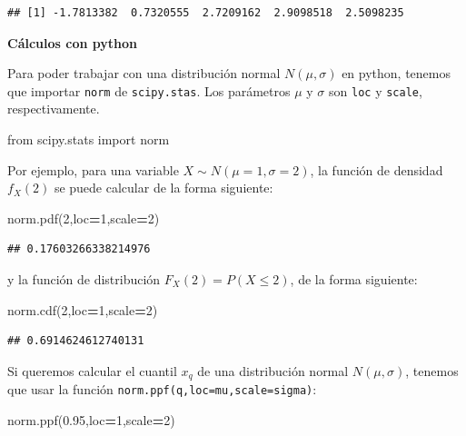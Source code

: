 \documentclass[]{book}
\newenvironment{Shaded}{\begin{snugshade}}{\end{snugshade}}
\newcommand{\DecValTok}[1]{\textcolor[rgb]{0.00,0.00,0.81}{#1}}
\newcommand{\FloatTok}[1]{\textcolor[rgb]{0.00,0.00,0.81}{#1}}
\newcommand{\ImportTok}[1]{#1}
\newcommand{\NormalTok}[1]{#1}
\newcommand{\OperatorTok}[1]{\textcolor[rgb]{0.81,0.36,0.00}{\textbf{#1}}}
\begin{document}
\begin{verbatim}
## [1] -1.7813382  0.7320555  2.7209162  2.9098518  2.5098235
\end{verbatim}

\textbf{Cálculos con python}

Para poder trabajar con una distribución normal \(N(\mu,\sigma)\) en python, tenemos que importar \texttt{norm} de \texttt{scipy.stas}. Los parámetros \(\mu\) y \(\sigma\) son \texttt{loc} y \texttt{scale}, respectivamente.

\begin{Shaded}
\begin{Highlighting}[]
\ImportTok{from}\NormalTok{ scipy.stats }\ImportTok{import}\NormalTok{ norm}
\end{Highlighting}
\end{Shaded}

Por ejemplo, para una variable \(X\sim N(\mu=1,\sigma=2)\), la función de densidad \(f_X(2)\) se puede calcular de la forma siguiente:

\begin{Shaded}
\begin{Highlighting}[]
\NormalTok{norm.pdf(}\DecValTok{2}\NormalTok{,loc}\OperatorTok{=}\DecValTok{1}\NormalTok{,scale}\OperatorTok{=}\DecValTok{2}\NormalTok{)}
\end{Highlighting}
\end{Shaded}

\begin{verbatim}
## 0.17603266338214976
\end{verbatim}

y la función de distribución \(F_X(2) = P(X\leq 2)\), de la forma siguiente:

\begin{Shaded}
\begin{Highlighting}[]
\NormalTok{norm.cdf(}\DecValTok{2}\NormalTok{,loc}\OperatorTok{=}\DecValTok{1}\NormalTok{,scale}\OperatorTok{=}\DecValTok{2}\NormalTok{)}
\end{Highlighting}
\end{Shaded}

\begin{verbatim}
## 0.6914624612740131
\end{verbatim}

Si queremos calcular el cuantil \(x_{q}\) de una distribución normal \(N(\mu,\sigma)\), tenemos que usar la función \texttt{norm.ppf(q,loc=mu,scale=sigma)}:

\begin{Shaded}
\begin{Highlighting}[]
\NormalTok{norm.ppf(}\FloatTok{0.95}\NormalTok{,loc}\OperatorTok{=}\DecValTok{1}\NormalTok{,scale}\OperatorTok{=}\DecValTok{2}\NormalTok{)}
\end{Highlighting}
\end{Shaded}
\end{document}
